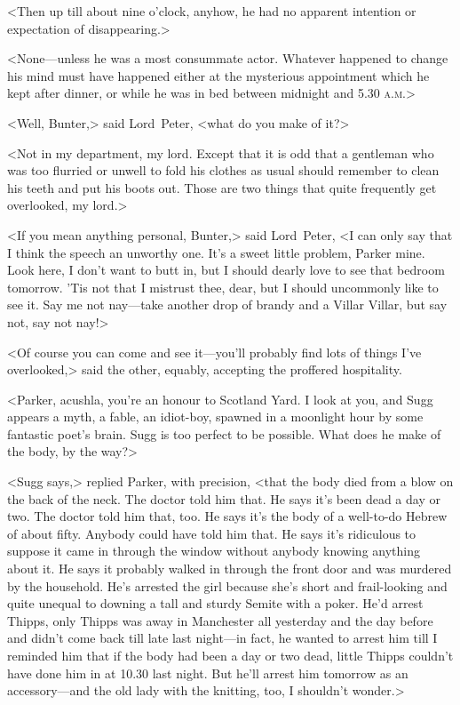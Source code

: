 <Then up till about nine o'clock, anyhow, he had no apparent intention or expectation of disappearing.>

<None—unless he was a most consummate actor. Whatever happened to change his mind must have happened either at the mysterious appointment which he kept after dinner, or while he was in bed between midnight and 5.30 \textsc{a.m.}>

<Well, Bunter,> said Lord~Peter, <what do you make of it?>

<Not in my department, my lord. Except that it is odd that a gentleman who was too flurried or unwell to fold his clothes as usual should remember to clean his teeth and put his boots out. Those are two things that quite frequently get overlooked, my lord.>

<If you mean anything personal, Bunter,> said Lord~Peter, <I can only say that I think the speech an unworthy one. It's a sweet little problem, Parker mine. Look here, I don't want to butt in, but I should dearly love to see that bedroom tomorrow. 'Tis not that I mistrust thee, dear, but I should uncommonly like to see it. Say me not nay—take another drop of brandy and a Villar Villar, but say not, say not nay!>

<Of course you can come and see it—you'll probably find lots of things I've overlooked,> said the other, equably, accepting the proffered hospitality.

<Parker, acushla, you're an honour to Scotland Yard. I look at you, and Sugg appears a myth, a fable, an idiot-boy, spawned in a moonlight hour by some fantastic poet's brain. Sugg is too perfect to be possible. What does he make of the body, by the way?>

<Sugg says,> replied Parker, with precision, <that the body died from a blow on the back of the neck. The doctor told him that. He says it's been dead a day or two. The doctor told him that, too. He says it's the body of a well-to-do Hebrew of about fifty. Anybody could have told him that. He says it's ridiculous to suppose it came in through the window without anybody knowing anything about it. He says it probably walked in through the front door and was murdered by the household. He's arrested the girl because she's short and frail-looking and quite unequal to downing a tall and sturdy Semite with a poker. He'd arrest Thipps, only Thipps was away in Manchester all yesterday and the day before and didn't come back till late last night—in fact, he wanted to arrest him till I reminded him that if the body had been a day or two dead, little Thipps couldn't have done him in at 10.30 last night. But he'll arrest him tomorrow as an accessory—and the old lady with the knitting, too, I shouldn't wonder.>

